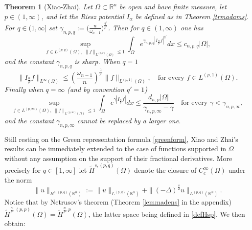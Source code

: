 \documentclass[11pt, a4paper]{article}
\newtheorem{trm}{Theorem}
\newcommand{\R}{\mathbb{R}}
\begin{document}
\begin{trm}[Xiao-Zhai]\label{XZ} Let $\Omega\subset\R^n$ be open and have finite measure, let $p\in (1,\infty)$, and let the Riesz potential $I_\alpha$ be defined as in Theorem \ref{trmadams}. For $q\in (1,\infty]$ set $\gamma_{n,p,q}:=\big(\frac{n}{\omega_{n-1}}\big)^\frac{q'}{p'}$. Then for $q\in (1,\infty)$ one has
$$\sup_{f\in L^{(p,q)}(\Omega), \;\|f\|_{L^{(p,q)}(\Omega)}\le 1}\int_\Omega e^{\gamma_{n,p,q}|I_\frac{n}{p} f|^{q'}}dx\le c_{n,p,q}|\Omega|,$$
and the constant $\gamma_{n,p,q}$ is sharp.
When $q=1$
$$\|I_\frac np f\|_{L^\infty(\Omega)}\le \left(\frac{\omega_{n-1}}{n}\right)^\frac{1}{p'}\|f\|_{L^{(p,1)}(\Omega)},\quad \text{for every }f\in L^{(p,1)}(\Omega).$$
Finally when $q=\infty$ (and by convention $q'=1$)
$$\sup_{f\in L^{(p,\infty)}(\Omega),\;\|f\|_{L^{(p,\infty)}(\Omega)}\le 1}\int_\Omega e^{\gamma|I_\frac{n}{p} f|}dx \le \frac{d_{n,p}|\Omega|}{\gamma_{n,p,\infty} -\gamma}\quad \text{for every }\gamma<\gamma_{n,p,\infty},$$
and the constant $\gamma_{n,p,\infty}$ cannot be replaced by a larger one.
\end{trm}


 Still resting on the Green representation formula \eqref{greenform}, Xiao and Zhai's results can be immediately extended to the case of functions supported in $\Omega$ without any assumption on the support of their fractional derivatives. More precisely for $q\in [1,\infty]$ let $\tilde H^{s,(p,q)}(\Omega)$ denote the closure of $C^\infty_c(\Omega)$ under the norm
\begin{equation}\label{defHspq}
\|u\|_{H^{s,(p,q)}(\R^n)}:=\|u\|_{L^{(p,q)}(\R^n)} +\|(-\Delta)^\frac{s}{2} u\|_{L^{(p,q)}(\R^n)}.
\end{equation}
Notice that by Netrusov's theorem (Theorem \ref{lemmadens} in the appendix) $\tilde H^{\frac{n}{p},(p,p)}(\Omega)=\tilde H^{\frac{n}{p},p}(\Omega)$, the latter space being defined in \eqref{defHsp}. We then obtain:
\end{document}

